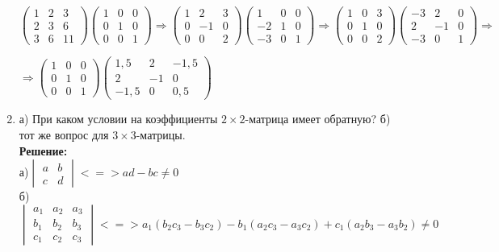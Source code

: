 \documentclass[]{book}
\theoremstyle{definition}
\begin{document}
\begin{enumerate}[resume]
 $ \begin{pmatrix} 
1 & 2 & 3\\
2 & 3 & 6 \\
3 & 6 & 11
\end{pmatrix}\begin{pmatrix} 
1 & 0 & 0\\
0 & 1 & 0 \\
0 & 0 & 1
\end{pmatrix} \Rightarrow\begin{pmatrix} 
1 & 2 & 3\\
0 & -1 & 0 \\
0 & 0 & 2
\end{pmatrix}\begin{pmatrix} 
1 & 0 & 0\\
-2 & 1 & 0 \\
-3 & 0 & 1
\end{pmatrix} \Rightarrow\begin{pmatrix} 
1 & 0 & 3\\
0 & 1 & 0 \\
0 & 0 & 2
\end{pmatrix}\begin{pmatrix} 
-3 & 2 & 0\\
2 & -1 & 0 \\
-3 & 0 & 1
\end{pmatrix} \Rightarrow
$

$
\Rightarrow \begin{pmatrix} 
1 & 0 & 0\\
0 & 1 & 0 \\
0 & 0 & 1
\end{pmatrix}\begin{pmatrix} 
1,5 & 2 & -1,5\\
2 & -1 & 0 \\
-1,5 & 0 & 0,5
\end{pmatrix}
$

\item а) При каком условии на коэффициенты $2\times 2$-матрица имеет  обратную?
б) тот же вопрос для $3\times 3$-матрицы.\\
\textbf{Решение:}
\\ а)$ \begin{vmatrix}
  a & b\\
  c & d
\end{vmatrix}  <=> ad - bc \neq 0$\\
б) $ \begin{vmatrix} 
      a_1 & a_2 & a_3 \\
      b_1 & b_2 & b_3 \\
      c_1 & c_2 & c_3
    \end{vmatrix} <=> a_1(b_2c_3 - b_3c_2) - b_1(a_2c_3 - a_3c_2) + c_1(a_2b_3 - a_3b_2)\neq 0  $



\end{enumerate}
\end{document}
